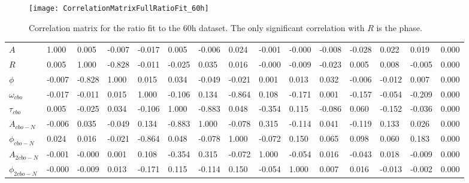 \begin{figure}[]
    \centering
    \texttt{[image: CorrelationMatrixFullRatioFit\_60h]}
    \caption[60h ratio fit correlation matrix]{Correlation matrix for the ratio fit to the 60h dataset. The only significant correlation with $R$ is the \gmtwo phase.}
    \label{fig:CorrMat_60h}
\end{figure}


\begin{landscape}
\begin{table}[]
\setlength\tabcolsep{5pt}
\footnotesize
\begin{tabular*}{\linewidth}{@{\extracolsep{\fill}}lLBLLLLLLLLLLLL}
  \toprule
            &  &  & \thead{$\phi$} &  &  &  &  &  &  &  &  &  &  &  \\
  \midrule
$A$                & 1.000 & 0.005 & -0.007 & -0.017 & 0.005 & -0.006 & 0.024 & -0.001 & -0.000 & -0.008 & -0.028 & 0.022 & 0.019 & 0.000  \\
$R$                & 0.005 & 1.000 & -0.828 & -0.011 & -0.025 & 0.035 & 0.016 & -0.000 & -0.009 & -0.023 & 0.005 & 0.008 & -0.005 & 0.000  \\
$\phi$             & -0.007 & -0.828 & 1.000 & 0.015 & 0.034 & -0.049 & -0.021 & 0.001 & 0.013 & 0.032 & -0.006 & -0.012 & 0.007 & 0.000  \\
$\omega_{cbo}$     & -0.017 & -0.011 & 0.015 & 1.000 & -0.106 & 0.134 & -0.864 & 0.108 & -0.171 & 0.001 & -0.157 & -0.054 & -0.209 & 0.000  \\
$\tau_{cbo}$       & 0.005 & -0.025 & 0.034 & -0.106 & 1.000 & -0.883 & 0.048 & -0.354 & 0.115 & -0.086 & 0.060 & -0.152 & -0.036 & 0.000  \\
$A_{cbo-N}$        & -0.006 & 0.035 & -0.049 & 0.134 & -0.883 & 1.000 & -0.078 & 0.315 & -0.114 & 0.041 & -0.119 & 0.133 & 0.026 & 0.000  \\
$\phi_{cbo-N}$     & 0.024 & 0.016 & -0.021 & -0.864 & 0.048 & -0.078 & 1.000 & -0.072 & 0.150 & 0.065 & 0.098 & 0.060 & 0.183 & 0.000  \\
$A_{2cbo-N}$       & -0.001 & -0.000 & 0.001 & 0.108 & -0.354 & 0.315 & -0.072 & 1.000 & -0.054 & 0.016 & -0.043 & 0.018 & -0.009 & 0.000  \\
$\phi_{2cbo-N}$    & -0.000 & -0.009 & 0.013 & -0.171 & 0.115 & -0.114 & 0.150 & -0.054 & 1.000 & 0.007 & 0.016 & -0.013 & -0.002 & 0.000  \\

\end{tabular*}
\end{table}
\end{landscape}
